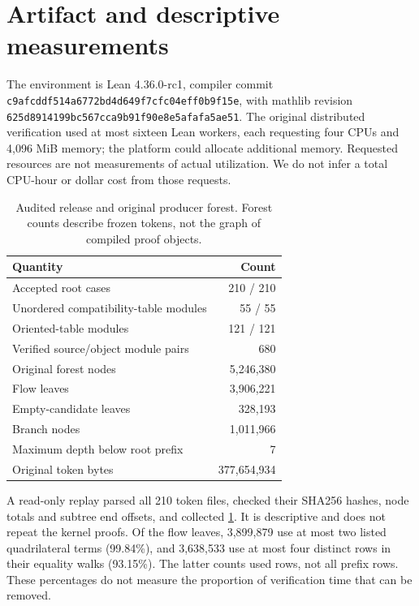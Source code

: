 \documentclass[11pt,a4paper]{article}
\theoremstyle{definition}
\begin{document}
\section{Artifact and descriptive measurements}\label{sec:measurements}
The environment is Lean 4.36.0-rc1, compiler commit
\nolinkurl{c9afcddf514a6772bd4d649f7cfc04eff0b9f15e}, with mathlib revision
\nolinkurl{625d8914199bc567cca9b91f90e8e5afafa5ae51}.
The original distributed verification used at most sixteen Lean workers, each requesting four CPUs and 4,096 MiB memory; the platform could allocate additional memory. Requested resources are not measurements of actual utilization. We do not infer a total CPU-hour or dollar cost from those requests.

\begin{table}[htbp]
\centering\caption{Audited release and original producer forest. Forest counts describe frozen tokens, not the graph of compiled proof objects.}\label{tab:counts}
\begin{tabular}{lr}\toprule
Quantity & Count\\\midrule
Accepted root cases & 210 / 210\\
Unordered compatibility-table modules & 55 / 55\\
Oriented-table modules & 121 / 121\\
Verified source/object module pairs & 680\\
Original forest nodes & 5,246,380\\
Flow leaves & 3,906,221\\
Empty-candidate leaves & 328,193\\
Branch nodes & 1,011,966\\
Maximum depth below root prefix & 7\\
Original token bytes & 377,654,934\\\bottomrule
\end{tabular}
\end{table}
A read-only replay parsed all 210 token files, checked their SHA256 hashes, node totals and subtree end offsets, and collected \cref{tab:counts}. It is descriptive and does not repeat the kernel proofs. Of the flow leaves, 3,899,879 use at most two listed quadrilateral terms (99.84\%), and 3,638,533 use at most four distinct rows in their equality walks (93.15\%). The latter counts used rows, not all prefix rows. These percentages do not measure the proportion of verification time that can be removed.
\end{document}
